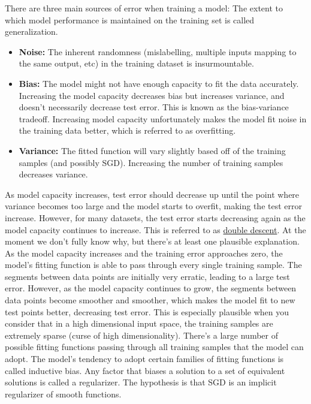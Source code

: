 \documentclass{article}
\begin{document}
There are three main sources of error when training a model: The extent to which model performance is maintained on the training set is called generalization.
\begin{itemize}
\item \textbf{Noise:} The inherent randomness (mislabelling, multiple inputs mapping to the same output, etc) in the training dataset is insurmountable.
\item \textbf{Bias:} The model might not have enough capacity to fit the data accurately. Increasing the model capacity decreases bias but increases variance, and doesn't necessarily decrease test error. This is known as the bias-variance tradeoff. Increasing model capacity unfortunately makes the model fit noise in the training data better, which is referred to as overfitting.
\item \textbf{Variance:} The fitted function will vary slightly based off of the training samples (and possibly SGD). Increasing the number of training samples decreases variance.
\end{itemize}

As model capacity increases, test error should decrease up until the point where variance becomes too large and the model starts to overfit, making the test error increase. However, for many datasets, the test error starts decreasing again as the model capacity continues to increase. This is referred to as \href{https://www.lesswrong.com/posts/FRv7ryoqtvSuqBxuT/understanding-deep-double-descent}{double descent}. At the moment we don't fully know why, but there's at least one plausible explanation. As the model capacity increases and the training error approaches zero, the model's fitting function is able to pass through every single training sample. The segments between data points are initially very erratic, leading to a large test error. However, as the model capacity continues to grow, the segments between data points become smoother and smoother, which makes the model fit to new test points better, decreasing test error. This is especially plausible when you consider that in a high dimensional input space, the training samples are extremely sparse (curse of high dimensionality). There's a large number of possible fitting functions passing through all training samples that the model can adopt. The model's tendency to adopt certain families of fitting functions is called inductive bias. Any factor that biases a solution to a set of equivalent solutions is called a regularizer. The hypothesis is that SGD is an implicit regularizer of smooth functions.
\end{document}

